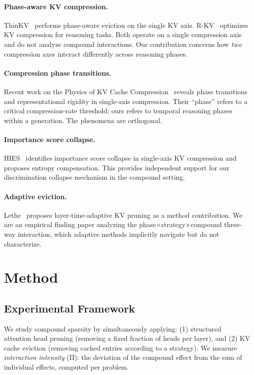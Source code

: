 \documentclass[11pt,a4paper]{article}
\begin{document}
\paragraph{Phase-aware KV compression.} ThinKV~\cite{thinkv2025} performs phase-aware eviction on the single KV axis. R-KV~\cite{rkv2025} optimizes KV compression for reasoning tasks. Both operate on a single compression axis and do not analyze compound interactions. Our contribution concerns how \emph{two} compression axes interact differently across reasoning phases.

\paragraph{Compression phase transitions.} Recent work on the Physics of KV Cache Compression~\cite{physicskv2026} reveals phase transitions and representational rigidity in single-axis compression. Their ``phase'' refers to a critical compression-rate threshold; ours refers to temporal reasoning phases within a generation. The phenomena are orthogonal.

\paragraph{Importance score collapse.} HIES~\cite{hies2025} identifies importance score collapse in single-axis KV compression and proposes entropy compensation. This provides independent support for our discrimination collapse mechanism in the compound setting.

\paragraph{Adaptive eviction.} Lethe~\cite{lethe2026} proposes layer-time-adaptive KV pruning as a method contribution. We are an empirical finding paper analyzing the phase$\times$strategy$\times$compound three-way interaction, which adaptive methods implicitly navigate but do not characterize.

\section{Method}

\subsection{Experimental Framework}

We study compound sparsity by simultaneously applying: (1) structured attention head pruning (removing a fixed fraction of heads per layer), and (2) KV cache eviction (removing cached entries according to a strategy). We measure \emph{interaction intensity} (II): the deviation of the compound effect from the sum of individual effects, computed per problem.
\end{document}
